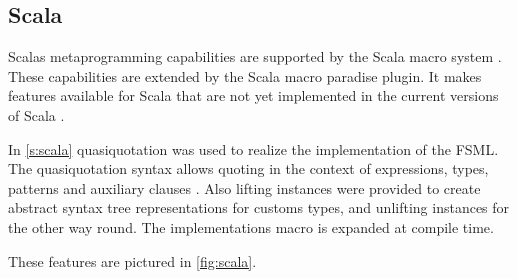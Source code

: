 \subsection{Scala}

Scalas metaprogramming capabilities are supported by the Scala macro system \cite{scalamacros} \cite{burmako2013scala}.
These capabilities are extended by the Scala macro paradise plugin.
It makes features available for Scala that are not yet implemented in the current versions of Scala \cite{scalamacroparadise}.

In \autoref{s:scala} quasiquotation was used to realize the implementation of the FSML.
The quasiquotation syntax allows quoting in the context of expressions, types, patterns and auxiliary clauses \cite{scalaquasiquotation}.
Also lifting instances were provided to create abstract syntax tree representations for customs types, and unlifting instances for the other way round. 
The implementations macro is expanded at compile time.

These features are pictured in \autoref{fig:scala}.

